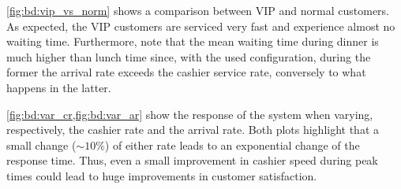 \cref{fig:bd:vip_vs_norm} shows a comparison between VIP and normal customers. As expected, the VIP customers are serviced very fast and experience almost no waiting time. Furthermore, note that the mean waiting time during dinner is much higher than lunch time since, with the used configuration, during the former the arrival rate exceeds the cashier service rate, conversely to what happens in the latter.

\cref{fig:bd:var_cr,fig:bd:var_ar} show the response of the system when varying, respectively, the cashier rate and the arrival rate. Both plots highlight that a small change ($\sim 10\%$) of either rate leads to an exponential change of the response time. Thus, even a small improvement in cashier speed during peak times could lead to huge improvements in customer satisfaction.

